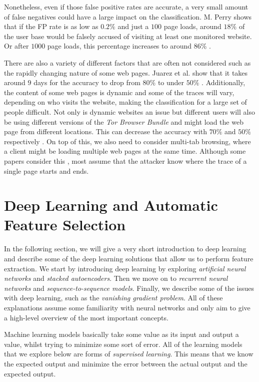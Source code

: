 Nonetheless, even if those false positive rates are accurate, a very small amount of false negatives could have a large impact on the classification.
M. Perry shows that if the FP rate is as low as $0.2\%$ and just a $100$ page loads, around $18\%$ of the user base would be falsely accused of visiting at least one monitored website.
Or after $1000$ page loads, this percentage increases to around $86\%$ \cite{wfpcritique}.

There are also a variety of different factors that are often not considered such as the rapidly changing nature of some web pages.
Juarez et al. show that it takes around $9$ days for the accuracy to drop from $80\%$ to under $50\%$ \cite{wfpevaluation}.
Additionally, the content of some web pages is dynamic and some of the traces will vary, depending on who visits the website, making the classification for a large set of people difficult.
Not only is dynamic websites an issue but different users will also be using different versions of the \textit{Tor Browser Bundle} and might load the web page from different locations.
This can decrease the accuracy with $70\%$ and $50\%$ respectively \cite{wfpevaluation}.
On top of this, we also need to consider multi-tab browsing, where a client might be loading multiple web pages at the same time.
Although some papers consider this \cite{naivebayes}, most assume that the attacker know where the trace of a single page starts and ends.

\section{Deep Learning and Automatic Feature Selection}

In the following section, we will give a very short introduction to deep learning and describe some of the deep learning solutions that allow us to perform feature extraction.
We start by introducing deep learning by exploring \textit{artificial neural networks} and \textit{stacked autoencoders}.
Then we move on to \textit{recurrent neural networks} and \textit{sequence-to-sequence models}.
Finally, we describe some of the issues with deep learning, such as the \textit{vanishing gradient problem}.
All of these explanations assume some familiarity with neural networks and only aim to give a high-level overview of the most important concepts.

Machine learning models basically take some value as its input and output a value, whilst trying to minimize some sort of error.
All of the learning models that we explore below are forms of \textit{supervised learning}.
This means that we know the expected output and minimize the error between the actual output and the expected output.

